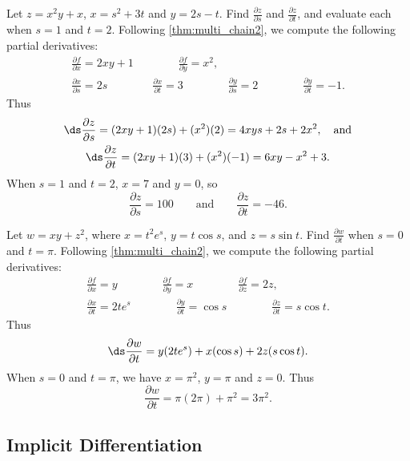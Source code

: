 
\begin{example}\label{ex_mchain3}
Let $z=x^2y+x$, $x=s^2+3t$ and $y=2s-t$. Find $\frac{\partial z}{\partial s}$ and $\frac{\partial z}{\partial t}$, and evaluate each when $s=1$ and $t=2$.
\solution
Following \autoref{thm:multi_chain2}, we compute the following partial derivatives:
\begin{gather*}
\frac{\partial f}{\partial x} = 2xy+1\qquad\qquad \frac{\partial f}{\partial y} = x^2,\\
\frac{\partial x}{\partial s} = 2s \qquad\qquad \frac{\partial x}{\partial t} = 3\qquad\qquad \frac{\partial y}{\partial s} = 2 \qquad\qquad \frac{\partial y}{\partial t} = -1.
\end{gather*}
Thus 
\begin{gather*}
\ds \frac{\partial z}{\partial s} = (2xy+1)(2s) + (x^2)(2) = 4xys+2s + 2x^2,\quad \text{and}\\
\ds \frac{\partial z}{\partial t} = (2xy+1)(3) + (x^2)(-1) = 6xy-x^2+3.
\end{gather*}
When $s=1$ and $t=2$, $x= 7$ and $y= 0$, so 
\[\frac{\partial z}{\partial s} = 100\qquad \text{and}\qquad \frac{\partial z}{\partial t} = -46.\]
\end{example}

\begin{example}\label{ex_mchain4}
Let $w = xy+z^2$, where $x= t^2e^s$, $y= t\cos s$, and $z=s\sin t$. Find $\frac{\partial w}{\partial t}$ when $s=0$ and $t=\pi$.
\solution
Following \autoref{thm:multi_chain2}, we compute the following partial derivatives:
\begin{gather*}
\frac{\partial f}{\partial x} = y\qquad\qquad \frac{\partial f}{\partial y} = x\qquad\qquad \frac{\partial f}{\partial z} = 2z,\\
\frac{\partial x}{\partial t} = 2te^s\qquad\qquad \frac{\partial y}{\partial t} = \cos s\qquad\qquad \frac{\partial z}{\partial t} = s\cos t.
\end{gather*}
Thus
\[\ds \frac{\partial w}{\partial t} = y(2te^s) + x(\cos s) + 2z(s\cos t).\] 
When $s=0$ and $t=\pi$, we have $x=\pi^2$, $y=\pi$ and $z=0$. Thus
\[\frac{\partial w}{\partial t} = \pi(2\pi) + \pi^2 = 3\pi^2.\]
\end{example}

\subsection{Implicit Differentiation}

